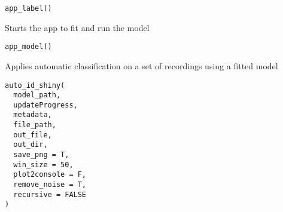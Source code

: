 \documentclass[letterpaper]{book}
\begin{document}
%
\begin{Usage}
\begin{verbatim}
app_label()
\end{verbatim}
\end{Usage}
%
\begin{Description}\relax
Starts the app to fit  and run the model
\end{Description}
%
\begin{Usage}
\begin{verbatim}
app_model()
\end{verbatim}
\end{Usage}
%
\begin{Description}\relax
Applies automatic classification on a set of recordings
using a fitted model
\end{Description}
%
\begin{Usage}
\begin{verbatim}
auto_id_shiny(
  model_path,
  updateProgress,
  metadata,
  file_path,
  out_file,
  out_dir,
  save_png = T,
  win_size = 50,
  plot2console = F,
  remove_noise = T,
  recursive = FALSE
)
\end{verbatim}
\end{Usage}
%
\end{document}
